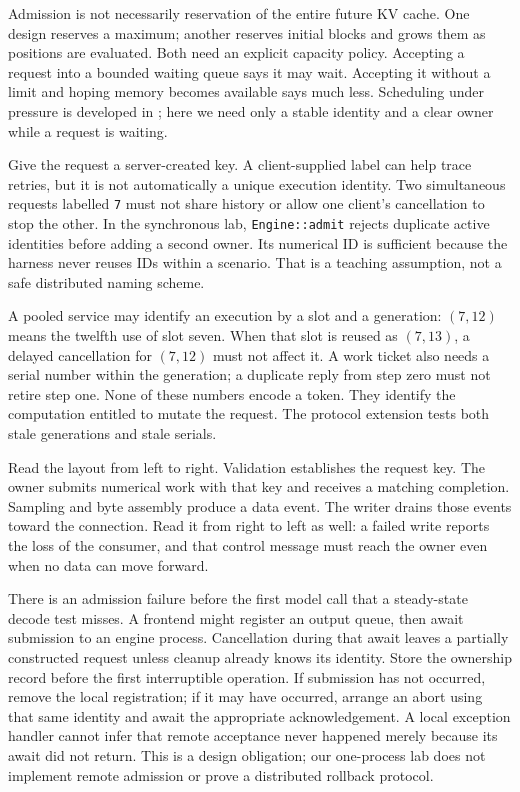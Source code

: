 Admission is not necessarily reservation of the entire future KV cache.
One design reserves a maximum; another reserves initial blocks and grows
them as positions are evaluated. Both need an explicit capacity policy.
Accepting a request into a bounded waiting queue says it may wait. Accepting
it without a limit and hoping memory becomes available says much less.
Scheduling under pressure is developed in ; here we need
only a stable identity and a clear owner while a request is waiting.

Give the request a server-created key. A client-supplied label can help trace
retries, but it is not automatically a unique execution identity. Two
simultaneous requests labelled \texttt{7} must not share history or allow one
client's cancellation to stop the other. In the synchronous lab,
\texttt{Engine::admit} rejects duplicate active identities before adding a
second owner. Its numerical ID is sufficient because the harness never
reuses IDs within a scenario. That is a teaching assumption, not a safe
distributed naming scheme.

A pooled service may identify an execution by a slot and a generation:
$(7,12)$ means the twelfth use of slot seven. When that slot is reused as
$(7,13)$, a delayed cancellation for $(7,12)$ must not affect it. A work
ticket also needs a serial number within the generation; a duplicate reply
from step zero must not retire step one. None of these numbers encode a
token. They identify the computation entitled to mutate the request.
The protocol extension tests both stale generations and stale serials.


Read the layout from left to right. Validation establishes the request key.
The owner submits numerical work with that key and receives a matching
completion. Sampling and byte assembly produce a data event. The writer
drains those events toward the connection. Read it from right to left as
well: a failed write reports the loss of the consumer, and that control
message must reach the owner even when no data can move forward.

There is an admission failure before the first model call that a steady-state
decode test misses. A frontend might register an output queue, then await
submission to an engine process. Cancellation during that await leaves a
partially constructed request unless cleanup already knows its identity.
Store the ownership record before the first interruptible operation.
If submission has not occurred, remove the local registration; if it may
have occurred, arrange an abort using that same identity and await the
appropriate acknowledgement. A local exception handler cannot infer that
remote acceptance never happened merely because its await did not return.
This is a design obligation; our one-process lab does not implement remote
admission or prove a distributed rollback protocol.

